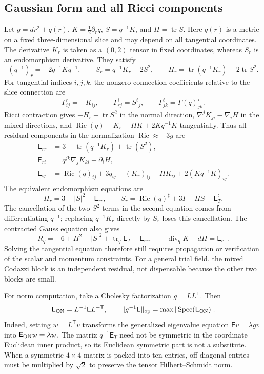 \documentclass[a4paper,11pt]{article}
\numberwithin{equation}{section}
\theoremstyle{definition}
\newcommand{\Ric}{\operatorname{Ric}}
\newcommand{\tr}{\operatorname{tr}}
\newcommand{\spec}{\operatorname{Spec}}
\newcommand{\op}{\mathrm{op}}
\begin{document}
\subsection{Gaussian form and all Ricci components}
Let $g=dr^2+q(r)$, $K=\frac12\partial_rq$, $S=q^{-1}K$, and $H=\tr S$.
Here $q(r)$ is a metric on a fixed three-dimensional slice and may depend on all tangential coordinates. The derivative $K_r$ is taken as a $(0,2)$ tensor in fixed coordinates, whereas $S_r$ is an endomorphism derivative. They satisfy
\[
 (q^{-1})_r=-2q^{-1}Kq^{-1},\qquad
 S_r=q^{-1}K_r-2S^2,\qquad
 H_r=\tr(q^{-1}K_r)-2\tr S^2.
\]
For tangential indices $i,j,k$, the nonzero connection coefficients relative to the slice connection are
\[
 \Gamma^r_{ij}=-K_{ij},\qquad
 \Gamma^i_{rj}=S^i{}_j,\qquad
 \Gamma^i_{jk}=\Gamma(q)^i_{jk}.
\]
Ricci contraction gives $-H_r-\tr S^2$ in the normal direction,
$\nabla^jK_{ji}-\nabla_iH$ in the mixed directions, and
$\Ric(q)-K_r-HK+2Kq^{-1}K$ tangentially.
Thus all residual components in the normalization $\Ric\approx-3g$ are
\begin{align}
\mathsf E_{rr}&=3-\tr(q^{-1}K_r)+\tr(S^2),\\
\mathsf E_{ri}&=q^{jk}\nabla_jK_{ki}-\partial_iH,\\
\mathsf E_{ij}&=\Ric(q)_{ij}+3q_{ij}-(K_r)_{ij}-HK_{ij}
+2(Kq^{-1}K)_{ij}.\label{eq:fullRic}
\end{align}
The equivalent endomorphism equations are
\begin{equation}\label{eq:gaussian-evolution}
 H_r=3-|S|^2-\mathsf E_{rr},\qquad
 S_r=\Ric(q)^\sharp+3I-HS-\mathsf E_T^\sharp.
\end{equation}
The cancellation of the two $S^2$ terms in the second equation comes from differentiating $q^{-1}$; replacing $q^{-1}K_r$ directly by $S_r$ loses this cancellation.
The contracted Gauss equation also gives
\begin{equation}\label{eq:gaussian-constraint}
 R_q=-6+H^2-|S|^2+\tr_q\mathsf E_T-\mathsf E_{rr},
 \qquad \operatorname{div}_qK-dH=\mathsf E_{r\cdot}.
\end{equation}
Solving the tangential equation therefore still requires propagation or verification of the scalar and momentum constraints.
For a general trial field, the mixed Codazzi block is an independent residual, not dispensable because the other two blocks are small.

For norm computation, take a Cholesky factorization $g=LL^{\mathsf T}$. Then
\begin{equation}\label{eq:orthonormal-residual}
 \mathsf E_{\rm ON}=L^{-1}\mathsf E L^{-\mathsf T},\qquad
 \|g^{-1}\mathsf E\|_\op=\max|\spec(\mathsf E_{\rm ON})|.
\end{equation}
Indeed, setting $w=L^{\mathsf T}v$ transforms the generalized eigenvalue equation $\mathsf E v=\lambda gv$ into $\mathsf E_{\rm ON}w=\lambda w$.
The matrix $q^{-1}\mathsf E_T$ need not be symmetric in the coordinate Euclidean inner product, so its Euclidean symmetric part is not a substitute.
When a symmetric $4\times4$ matrix is packed into ten entries, off-diagonal entries must be multiplied by $\sqrt2$ to preserve the tensor Hilbert--Schmidt norm.
\end{document}
